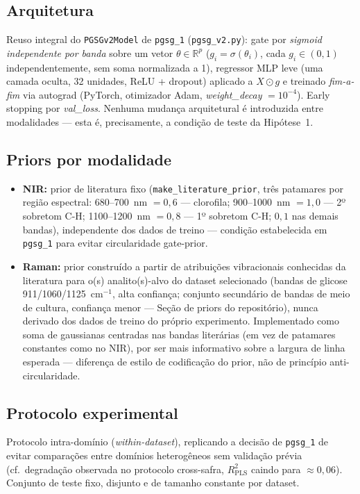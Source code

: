 \documentclass[11pt,a4paper]{article}
\begin{document}
\subsection{Arquitetura}
Reuso integral do \texttt{PGSGv2Model} de \texttt{pgsg\_1} (\texttt{pgsg\_v2.py}): gate por \emph{sigmoid independente por banda} sobre um vetor $\theta \in \mathbb{R}^p$ ($g_i = \sigma(\theta_i)$, cada $g_i \in (0,1)$ independentemente, sem soma normalizada a 1), regressor MLP leve (uma camada oculta, 32 unidades, ReLU + dropout) aplicado a $X \odot g$ e treinado \emph{fim-a-fim} via autograd (PyTorch, otimizador Adam, \emph{weight\_decay} $=10^{-4}$). Early stopping por \emph{val\_loss}. Nenhuma mudança arquitetural é introduzida entre modalidades --- esta é, precisamente, a condição de teste da Hipótese~1.

\subsection{Priors por modalidade}
\begin{itemize}
\item \textbf{NIR:} prior de literatura fixo (\texttt{make\_literature\_prior}, três patamares por região espectral: 680--700~nm $=0{,}6$ --- clorofila; 900--1000~nm $=1{,}0$ --- 2º sobretom C-H; 1100--1200~nm $=0{,}8$ --- 1º sobretom C-H; $0{,}1$ nas demais bandas), independente dos dados de treino --- condição estabelecida em \texttt{pgsg\_1} para evitar circularidade gate-prior.
\item \textbf{Raman:} prior construído a partir de atribuições vibracionais conhecidas da literatura para o(s) analito(s)-alvo do dataset selecionado (bandas de glicose 911/1060/1125~cm$^{-1}$, alta confiança; conjunto secundário de bandas de meio de cultura, confiança menor --- Seção de priors do repositório), nunca derivado dos dados de treino do próprio experimento. Implementado como soma de gaussianas centradas nas bandas literárias (em vez de patamares constantes como no NIR), por ser mais informativo sobre a largura de linha esperada --- diferença de estilo de codificação do prior, não de princípio anti-circularidade.
\end{itemize}

\subsection{Protocolo experimental}
Protocolo intra-domínio (\emph{within-dataset}), replicando a decisão de \texttt{pgsg\_1} de evitar comparações entre domínios heterogêneos sem validação prévia (cf.\ degradação observada no protocolo cross-safra, $R^2_{\text{PLS}}$ caindo para $\approx 0{,}06$). Conjunto de teste fixo, disjunto e de tamanho constante por dataset.
\end{document}
